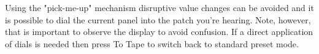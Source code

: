 Using the "pick-me-up" mechanism disruptive value changes can be avoided and it is possible to dial the current panel into the patch you're hearing. Note, however, that is important to observe the display to avoid confusion. If a direct application of dials is needed then press To Tape to switch back to standard preset mode.
